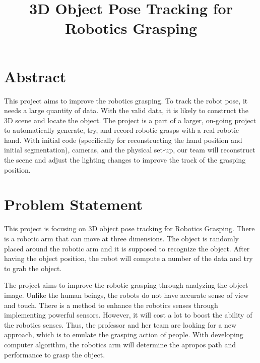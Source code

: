 \documentclass[letterpaper,10pt,fleqn,draftclsnofoot,onecolumn]{IEEEtran}
\title{3D Object Pose Tracking for Robotics Grasping}
\author{\name}
\begin{document}
	\maketitle
	\hrulefill
	{\selectfont
	\section*{Abstract}
	This project aims to improve the robotics grasping. To track the robot pose, it needs a large quantity of data. With the valid data, it is likely to construct the 3D scene and locate the object. The project is a part of a larger, on-going project to automatically generate, try, and record robotic grasps with a real robotic hand. With initial code (specifically for reconstructing the hand position and initial segmentation), cameras, and the physical set-up, our team will reconstruct the scene and adjust the lighting changes to improve the track of the grasping position. 
	\newpage
	
	\section*{Problem Statement}
	This project is focusing on 3D object pose tracking for Robotics Grasping. There is a robotic arm that can move at three dimensions. The object is randomly placed around the robotic arm and it is supposed to recognize the object. After having the object position, the robot will compute a number of the data and try to grab the object. \newline
	
The project aims to improve the robotic grasping through analyzing the object image. Unlike the human beings, the robots do not have accurate sense of view and touch. There is a method to enhance the robotics senses through implementing powerful sensors. However, it will cost a lot to boost the ability of the robotics senses. Thus, the professor and her team are looking for a new approach, which is to emulate the grasping action of people. With developing computer algorithm, the robotics arm will determine the apropos path and performance to grasp the object. 

	
}
\end{document}
